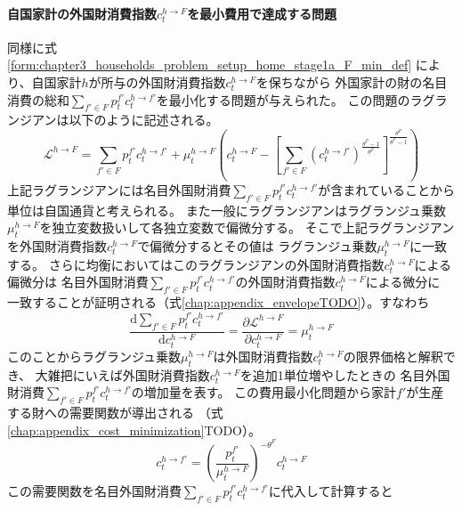 \paragraph{自国家計の外国財消費指数\(c_t^{h\to F}\)を最小費用で達成する問題}
\label{sec:chapter3_households_stage1a_home_c_h_F_problem}
同様に式
\eqref{form:chapter3_households_problem_setup_home_stage1a_F_min_def}
により、自国家計\(h\)が所与の外国財消費指数\(c_t^{h\to F}\)を保ちながら
外国家計の財の名目消費の総和\(\sum_{f'\in F}p_t^{f'}c_t^{h\to f'}\)を最小化する問題が与えられた。
この問題のラグランジアンは以下のように記述される。
\begin{equation}
\label{form:chapter3_households_stage1a_home_c_h_F_problem_lagrangian_def}
    \mathcal{L}^{h\to F}=\sum_{f'\in F}p_t^{f'}c_t^{h\to f'}+\mu_t^{h\to F}\left(c_t^{h\to F}-\left[\sum_{f'\in F}(c_t^{h\to f'})^{\frac{\theta^F-1}{\theta^F}}\right]^{\frac{\theta^F}{\theta^F-1}}\right)
\end{equation}
上記ラグランジアンには名目外国財消費\(\sum_{f'\in F}p_t^{f'}c_t^{h\to f'}\)が含まれていることから
単位は自国通貨と考えられる。
また一般にラグランジアンはラグランジュ乗数\(\mu_t^{h\to F}\)を独立変数扱いして各独立変数で偏微分する。
そこで上記ラグランジアンを外国財消費指数\(c_t^{h\to F}\)で偏微分するとその値は
ラグランジュ乗数\(\mu_t^{h\to F}\)に一致する。
さらに均衡においてはこのラグランジアンの外国財消費指数\(c_t^{h\to F}\)による偏微分は
名目外国財消費\(\sum_{f'\in F}p_t^{f'}c_t^{h\to f'}\)の外国財消費指数\(c_t^{h\to F}\)による微分に
一致することが証明される（式\eqref{chap:appendix_envelopeTODO}）。すなわち
\begin{equation}
\label{form:chapter3_households_stage1a_home_c_h_F_problem_mu_h_F_marginal_eq}
    \frac{\mathrm{d}\sum_{f'\in F}p_t^{f'}c_t^{h\to f'}}{\mathrm{d}c_t^{h\to F}}=\frac{\partial \mathcal{L}^{h\to F}}{\partial c_t^{h\to F}}=\mu_t^{h\to F}
\end{equation}
このことからラグランジュ乗数\(\mu_t^{h\to F}\)は外国財消費指数\(c_t^{h\to F}\)の限界価格と解釈でき、
大雑把にいえば外国財消費指数\(c_t^{h\to F}\)を追加1単位増やしたときの
名目外国財消費\(\sum_{f'\in F}p_t^{f'}c_t^{h\to f'}\)の増加量を表す。
この費用最小化問題から家計\(f'\)が生産する財への需要関数が導出される
（式\eqref{chap:appendix_cost_minimization}TODO）。
\begin{equation}
\label{form:chapter3_households_stage1a_home_c_h_F_problem_c_h_f_eq}
    c_t^{h\to f'}=\left(\frac{p_t^{f'}}{\mu_t^{h\to F}}\right)^{-\theta^F}c_t^{h\to F}
\end{equation}
この需要関数を名目外国財消費\(\sum_{f'\in F}p_t^{f'}c_t^{h\to f'}\)に代入して計算すると
